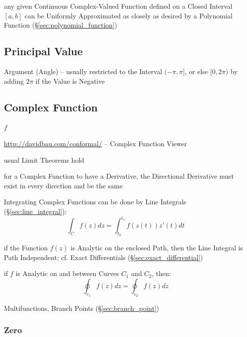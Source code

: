 any given Continuous Complex-Valued Function defined on a Closed Interval
$[a,b]$ can be Uniformly Approximated as closely as desired by a Polynomial
Function (\S\ref{sec:polynomial_function})



\subsection{Principal Value}\label{sec:principal_value}

Argument (Angle) -- usually restricted to the Interval $(-\pi,\pi]$, or else
$[0,2\pi)$ by adding $2\pi$ if the Value is Negative



\subsection{Complex Function}\label{sec:complex_function}

$f$

\url{http://davidbau.com/conformal/} -- Complex Function Viewer

usual Limit Theorems hold

for a Complex Function to have a Derivative, the Directional Derivative must
exist in every direction and be the same

Integrating Complex Functions can be done by Line Integrals
(\S\ref{sec:line_integral}):
\[
  \int_{C} f(z) dz = \int_{t_0}^{t_1} f(z(t)) z'(t) dt
\]

if the Function $f(z)$ is Analytic on the enclosed Path, then the Line Integral
is Path Independent; cf. Exact Differentials (\S\ref{sec:exact_differential})

if $f$ is Analytic on and between Curves $C_1$ and $C_2$, then:
\[
  \oint_{c_1} f(z) dz = \oint_{c_2} f(z) dz
\]

Multifunctions, Branch Points (\S\ref{sec:branch_point})



\subsubsection{Zero}\label{sec:complex_zero}


